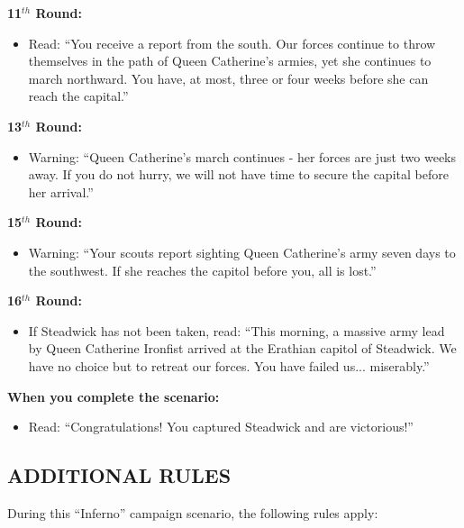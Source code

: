 \begin{multicols*}{2}
\textbf{11$^{th}$ Round:}
\begin{itemize}
  \item Read: ``You receive a report from the south. Our forces continue to throw themselves in the path of
    Queen Catherine's armies, yet she continues to march northward. You have, at most, three or four weeks
    before she can reach the capital.''
\end{itemize}

\textbf{13$^{th}$ Round:}
\begin{itemize}
  \item Warning: ``Queen Catherine's march continues - her forces are just two weeks away. If you do not hurry,
    we will not have time to secure the capital before her arrival.''
\end{itemize}

\textbf{15$^{th}$ Round:}
\begin{itemize}
  \item Warning: ``Your scouts report sighting Queen Catherine's army seven days to the southwest. If she
    reaches the capitol before you, all is lost.''
\end{itemize}

\textbf{16$^{th}$ Round:}
\begin{itemize}
  \item If Steadwick has not been taken, read: ``This morning, a massive army lead by Queen Catherine
    Ironfist arrived at the Erathian capitol of Steadwick. We have no choice but to retreat our forces.
    You have failed us... miserably.''
\end{itemize}

\textbf{When you complete the scenario:}
\begin{itemize}
  \item Read: ``Congratulations! You captured Steadwick and are victorious!''
\end{itemize}

\columnbreak

\subsection*{\MakeUppercase{Additional rules}}

During this ``Inferno'' campaign scenario, the following rules apply:


\end{multicols*}

